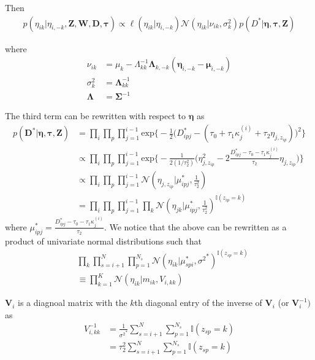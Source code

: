 Then
\begin{align}
    p(\eta_{ik}|\eta_{i,-k},\mathbf{Z},\mathbf{W},\mathbf{D},\pmb\tau) \propto \ell(\eta_{ik}|\eta_{i,-k})\mathcal{N}(\eta_{ik}|\nu_{ik},\sigma_k^2)p(D^*|\pmb\eta,\pmb\tau,\mathbf{Z})
\end{align}

where
\begin{align}
    \nu_{ik} &= \mu_k - \Lambda_{kk}^{-1}\pmb\Lambda_{k,-k}(\pmb\eta_{i,-k}-\pmb\mu_{i,-k}) \nonumber \\
    \sigma_k^2 &= \pmb\Lambda_{kk}^{-1} \nonumber \\
    \pmb\Lambda &= \pmb\Sigma^{-1}
\end{align}

The third term can be rewritten with respect to $\pmb\eta$ as 
\begin{align}
    p(\mathbf{D}^*|\pmb\eta,\pmb\tau,\mathbf{Z}) &=  \prod_i\prod_p\prod_{j=1}^{i-1}\text{exp}\Bigg\{-\frac{1}{2}\big(D_{ipj}^* - (\tau_0 + \tau_1\kappa_j^{(i)} + \tau_2\eta_{j,z_{ip}})\big)^2 \Bigg\} \nonumber \\
    &\propto \prod_i\prod_p\prod_{j=1}^{i-1}\text{exp}\Bigg\{-\frac{1}{2(1/\tau_2^2)}\Big(\eta_{j,z_{ip}}^2 - 2\frac{D_{ipj}^* - \tau_0 - \tau_1\kappa_j^{(i)}}{\tau_2}\eta_{j,z_{ip}} \Big) \Bigg\}  \nonumber \\
    &\propto \prod_i\prod_p\prod_{j=1}^{i-1} \mathcal{N}(\eta_{j,z_{ip}}|\mu_{ipj}^*,\frac{1}{\tau_2^2}) \nonumber \\
    &= \prod_i\prod_p\prod_{j=1}^{i-1}\prod_k \mathcal{N}(\eta_{jk}|\mu_{ipj}^*,\frac{1}{\tau_2^2})^{\mathbb{I}(z_{ip}=k)}
\end{align}
where $\mu_{ipj}^* = \frac{D_{ipj}^* - \tau_0 - \tau_1\kappa_j^{(i)}}{\tau_2}$.
We notice that the above can be rewritten as a product of univariate normal distributions such that
\begin{align}
    & \prod_k\prod_{s=i+1}^N\prod_{p=1}^{N_s}\mathcal{N}(\eta_{ik}|\mu_{spi}^*,{\sigma^2}^*)^{\mathbb{I}(z_{sp}=k)} \nonumber \\
    &\equiv  \prod_{k=1}^K \mathcal{N}(\eta_{ik} | m_{ik},V_{i,kk})
\end{align}

$\mathbf{V}_i$ is a diagnoal matrix with the $k$th diagonal entry of the inverse of $\mathbf{V}_i$ (or $\mathbf{V}_i^{-1})$ as
\begin{align}
    V_{i,kk}^{-1} &= \frac{1}{{\sigma^2}^*} \sum_{s=i+1}^N\sum_{p=1}^{N_s}\mathbb{I}(z_{sp} = k) \nonumber \\
    &= \tau_2^2 \sum_{s=i+1}^N\sum_{p=1}^{N_s}\mathbb{I}(z_{sp} = k)
\end{align}

